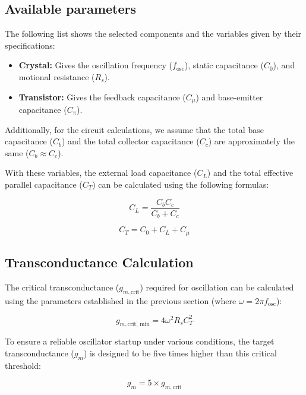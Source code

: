  \subsection{Available parameters}
 
 The following list shows the selected components and the variables given by their specifications:
 
 \begin{itemize}
 	\item \textbf{Crystal:} Gives the oscillation frequency ($f_{\text{osc}}$), static capacitance ($C_0$), and motional resistance ($R_s$).
 	\item \textbf{Transistor:} Gives the feedback capacitance ($C_\mu$) and base-emitter capacitance ($C_\pi$).
 \end{itemize}
 
 Additionally, for the circuit calculations, we assume that the total base capacitance ($C_b$) and the total collector capacitance ($C_c$) are approximately the same ($C_b \approx C_c$). 
 
 With these variables, the external load capacitance ($C_L$) and the total effective parallel capacitance ($C_T$) can be calculated using the following formulas:
 
 \begin{equation}
 	C_L = \frac{C_b C_c}{C_b + C_c}
 \end{equation}
 
 \begin{equation}
 	C_T = C_0 + C_L + C_\mu
 \end{equation}
 
 
 
\subsection{Transconductance Calculation}

The critical transconductance ($g_{m,\text{crit}}$) required for oscillation can be calculated using the parameters established in the previous section (where $\omega = 2\pi f_{\text{osc}}$):

\begin{equation}
	g_{m,\text{crit, min}} = 4 \omega^2 R_s C_T^2
\end{equation}

To ensure a reliable oscillator startup under various conditions, the target transconductance ($g_m$) is designed to be five times higher than this critical threshold:

\begin{equation}
	g_m = 5 \times g_{m,\text{crit}}
\end{equation}

